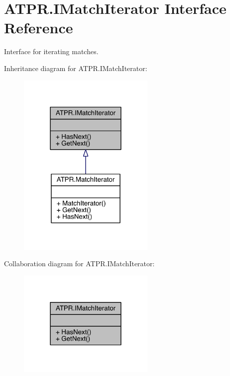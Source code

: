 \hypertarget{interface_a_t_p_r_1_1_i_match_iterator}{}\section{A\+T\+P\+R.\+I\+Match\+Iterator Interface Reference}
\label{interface_a_t_p_r_1_1_i_match_iterator}


Interface for iterating matches.  




Inheritance diagram for A\+T\+P\+R.\+I\+Match\+Iterator\+:
\nopagebreak
\begin{figure}[H]
\begin{center}
\leavevmode
\includegraphics[width=186pt]{d9/d31/interface_a_t_p_r_1_1_i_match_iterator__inherit__graph}
\end{center}
\end{figure}


Collaboration diagram for A\+T\+P\+R.\+I\+Match\+Iterator\+:
\nopagebreak
\begin{figure}[H]
\begin{center}
\leavevmode
\includegraphics[width=186pt]{d2/df5/interface_a_t_p_r_1_1_i_match_iterator__coll__graph}
\end{center}
\end{figure}
